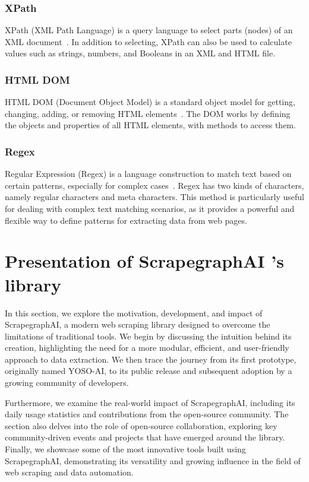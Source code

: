 \subsubsection{XPath}
XPath (XML Path Language) is a query language to select parts (nodes) of an XML document~\cite{darmawan2022evaluating}. In addition to selecting, XPath can also be used to calculate values such as strings, numbers, and Booleans in an XML and HTML file.
\subsubsection{HTML DOM}
HTML DOM (Document Object Model) is a standard object model for getting, changing, adding, or removing HTML elements~\cite{darmawan2022evaluating}. The DOM works by defining the objects and properties of all HTML elements, with methods to access them.
\subsubsection{Regex}
Regular Expression (Regex) is a language construction to match text based on certain patterns, especially for complex cases~\cite{darmawan2022evaluating}. Regex has two kinds of characters, namely regular characters and meta characters. This method is particularly useful for dealing with complex text matching scenarios, as it provides a powerful and flexible way to define patterns for extracting data from web pages.

\clearpage
\section{Presentation of ScrapegraphAI ’s library}
In this section, we explore the motivation, development, and impact of ScrapegraphAI, a modern web scraping library designed to overcome the limitations of traditional tools. We begin by discussing the intuition behind its creation, highlighting the need for a more modular, efficient, and user-friendly approach to data extraction. We then trace the journey from its first prototype, originally named YOSO-AI, to its public release and subsequent adoption by a growing community of developers.

Furthermore, we examine the real-world impact of ScrapegraphAI, including its daily usage statistics and contributions from the open-source community. The section also delves into the role of open-source collaboration, exploring key community-driven events and projects that have emerged around the library. Finally, we showcase some of the most innovative tools built using ScrapegraphAI, demonstrating its versatility and growing influence in the field of web scraping and data automation.
